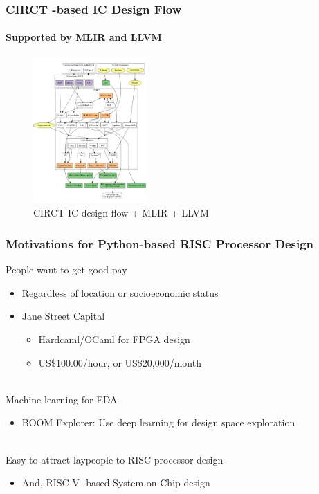 \documentclass[xcolor={usenames,dvipsnames},hyperref={hyperindex,bookmarks}]{beamer}
\begin{document}
\begin{frame}
	\frametitle{CIRCT -based IC Design Flow}
	\framesubtitle{Supported by MLIR and LLVM}
	
	\begin{figure}
		\centering
		\includegraphics[height=2.2in]{./pics/CIRCTMLIR}
		\caption{CIRCT IC design flow + MLIR + LLVM}
	\end{figure}
\end{frame}






\begin{frame}
	\frametitle{Motivations for Python-based RISC Processor Design}
	
	People want to get good pay
		\begin{itemize}
		\item Regardless of location or socioeconomic status
		\item Jane Street Capital
			\begin{itemize}
			\item Hardcaml/OCaml for FPGA design
			\item US\$100.00/hour, or US\$20,000/month
			\end{itemize}
		\end{itemize}
	\ \\
	Machine learning for EDA
		\begin{itemize}
		\item BOOM Explorer: Use deep learning for design space exploration
		\end{itemize}
	\ \\
	Easy to attract laypeople to RISC processor design
		\begin{itemize}
		\item And, RISC-V -based System-on-Chip design
		\end{itemize}

\end{frame}












%		
%		
\end{document}
